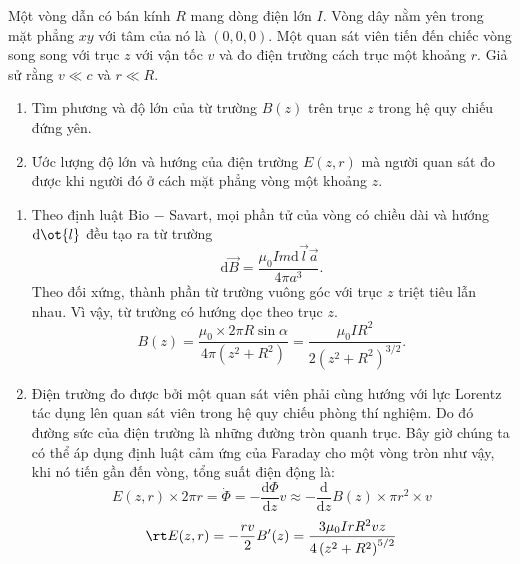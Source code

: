 \begin{vd}
    Một vòng dẫn có bán kính $R$ mang dòng điện lớn $I$. Vòng dây nằm yên trong mặt phẳng $xy$ với tâm của nó là $(0,0,0)$. Một quan sát viên tiến đến chiếc vòng song song với trục $z$ với vận tốc $v$ và đo điện trường cách trục một khoảng $r$. Giả sử rằng $v\ll c$ và $r \ll R$.
    \begin{enumerate}[1)]
        \item Tìm phương và độ lớn của từ trường $B(z)$ trên trục $z$ trong hệ quy chiếu đứng yên.
        \item Ước lượng độ lớn và hướng của điện trường $E(z,r)$ mà người quan sát đo được khi người đó ở cách mặt phẳng vòng một khoảng $z$.
    \end{enumerate} 
\end{vd}

\begin{loigiai}
    \begin{enumerate}[1)]
        \item Theo định luật Bio $-$ Savart, mọi phần tử của vòng có chiều dài và hướng $\mathrm{d}\ot{l}$ đều tạo ra từ trường
        \[{\mathrm{d}}\overrightarrow B  = \frac{{{\mu _0}Im{\mathrm{d}}\overrightarrow l \overrightarrow a }}{{4\pi {a^3}}}.\]
        Theo đối xứng, thành phần từ trường vuông góc với trục $z$ triệt tiêu lẫn nhau. Vì vậy, từ trường có hướng dọc theo trục $z$.
        \[B(z) = \dfrac{\mu_0 \times 2\pi R \sin \alpha}{4\pi \left(z^2+R^2\right)}=\dfrac{\mu_0IR^2}{2\left(z^2+R^2\right)^{3/2}}.\]
        \item Điện trường đo được bởi một quan sát viên phải cùng hướng với lực Lorentz tác dụng lên quan sát viên trong hệ quy chiếu phòng thí nghiệm. Do đó đường sức của điện trường là những đường tròn quanh trục. Bây giờ chúng ta có thể áp dụng định luật cảm ứng của Faraday cho một vòng tròn như vậy, khi nó tiến gần đến vòng, tổng suất điện động là: 
        \[E(z,r)\times 2\pi r= \dot\Phi=-\dfrac{\mathrm{d}\Phi}{\mathrm{d}z}v \approx -\dfrac{\mathrm{d}}{\mathrm{d}z}B(z)\times \pi r^2 \times v\]
        \[\rt E(z,r)=-\dfrac{rv}{2}B'(z)=\dfrac{3\mu_0IrR^2vz}{4\left(z^2+R^2\right)^{5/2}}\]
    \end{enumerate}
\end{loigiai}

